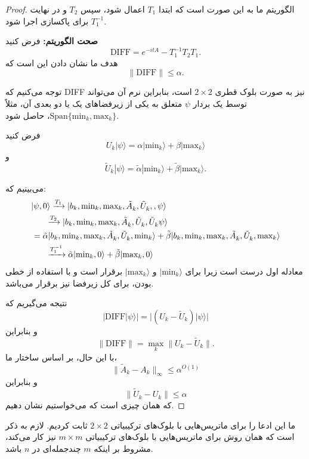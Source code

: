\begin{proof}
الگوریتم ما به این صورت است که ابتدا $T_1$ اعمال شود، سپس $T_2$ و در نهایت $T_1^{-1}$ برای پاکسازی اجرا شود.	

\textbf{صحت الگوریتم:}  
فرض کنید 
\[
\text{DIFF} = e^{-i t A} - T_1^{-1} T_2 T_1.
\]  
هدف ما نشان دادن این است که 
\[
\|\text{DIFF}\| \le \alpha.
\]  

توجه می‌کنیم که DIFF نیز به صورت بلوک قطری $2 \times 2$ است، بنابراین نرم آن می‌تواند توسط یک بردار $\psi$ متعلق به یکی از زیرفضاهای یک یا دو بعدی آن، مثلاً $\text{Span}\{\text{min}_k, \text{max}_k\}$، حاصل شود.  

فرض کنید
\[
U_k |\psi\rangle = \alpha | \text{min}_k\rangle + \beta | \text{max}_k\rangle
\]  
و
\[
\tilde{U}_k |\psi\rangle = \tilde{\alpha} | \text{min}_k\rangle + \tilde{\beta} | \text{max}_k\rangle.
\]  

می‌بینیم که:
\[\begin{gathered}
	|\psi ,0\rangle \xrightarrow{{{T_1}}}|{b_k},{\text{mi}}{{\text{n}}_k},{\text{ma}}{{\text{x}}_k},\tilde A_k^{},\tilde U_k^{},,\psi \rangle  \hfill \\
	\,\,\,\,\,\,\,\,\,\,\,\,\xrightarrow{{{T_2}}}|{b_k},{\text{mi}}{{\text{n}}_k},{\text{ma}}{{\text{x}}_k},\tilde A_k^{},\tilde U_k^{},\tilde U_k^{}\psi \rangle  \hfill \\
	\,\, = \tilde \alpha |{b_k},{\text{mi}}{{\text{n}}_k},{\text{ma}}{{\text{x}}_k},\tilde A_k^{},\tilde U_k^{},{\text{mi}}{{\text{n}}_k}\rangle  + \tilde \beta |{b_k},{\text{mi}}{{\text{n}}_k},{\text{ma}}{{\text{x}}_k},\tilde A_k^{},\tilde U_k^{},{\text{ma}}{{\text{x}}_k}\rangle  \hfill \\
	\,\,\,\,\,\,\,\,\,\,\,\,\xrightarrow{{T_1^{ - 1}}}\tilde \alpha |{\text{mi}}{{\text{n}}_k},0\rangle  + \tilde \beta |{\text{ma}}{{\text{x}}_k},0\rangle  \hfill \\ 
\end{gathered} \]
معادله اول درست است زیرا برای $|\text{min}_k\rangle$ و $|\text{max}_k\rangle$ برقرار است و با استفاده از خطی بودن، برای کل زیرفضا نیز برقرار می‌باشد.  

نتیجه می‌گیریم که 
\[
|\text{DIFF} |\psi\rangle| = |(U_k - \tilde{U}_k) |\psi\rangle|
\]  
و بنابراین 
\[
\|\text{DIFF}\| = \max_k \| U_k - \tilde{U}_k \|.
\]  
با این حال، بر اساس ساختار ما،  
\[
\| \tilde{A}_k - A_k \|_\infty \le \alpha^{O(1)}
\]  
و بنابراین 
\[
\| \tilde{U}_k - U_k \| \le \alpha
\]  
که همان چیزی است که می‌خواستیم نشان دهیم.
\end{proof}
ما این ادعا را برای ماتریس‌هایی با بلوک‌های ترکیبیاتی $2 \times 2$ ثابت کردیم. لازم به ذکر است که همان روش برای ماتریس‌هایی با بلوک‌های ترکیبیاتی $m \times m$ نیز کار می‌کند، مشروط بر اینکه $m$ چندجمله‌ای در $n$ باشد.
